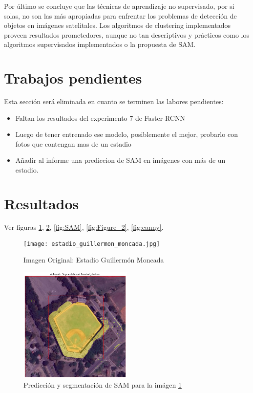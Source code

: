 \documentclass[article]{llncs}
\begin{document}
Por \'ultimo se concluye que las t\'ecnicas de aprendizaje no supervisado, por si solas, no son las m\'as apropiadas 
para enfrentar los problemas de detección de objetos en im\'agenes satelitales. Los algoritmos de clustering implementados 
proveen resultados prometedores, aunque no tan descriptivos y pr\'acticos como los algoritmos supervisados implementados o la 
propuesta de SAM.

\section{Trabajos pendientes}
Esta secci\'on ser\'a eliminada en cuanto se terminen las labores pendientes:

\begin{itemize}
    \item Faltan los resultados del experimento 7 de Faster-RCNN
    \item Luego de tener entrenado ese modelo, posiblemente el mejor, probarlo con fotos que contengan mas de un estadio
    \item Añadir al informe una prediccion de SAM en im\'agenes con m\'as de un estadio.
\end{itemize}

\section{Resultados}

Ver figuras \ref{fig:estadio_guillermon_moncada}, \ref{fig:Figure_1}, \ref{fig:SAM}, \ref{fig:Figure_2}, \ref{fig:canny}.

\begin{figure}[h]
  \centering
  \texttt{[image: estadio\_guillermon\_moncada.jpg]}
  \caption{Imagen Original: Estadio Guillerm\'on Moncada}
  \label{fig:estadio_guillermon_moncada}
\end{figure}

\begin{figure}[h]
  \centering
  \includegraphics[width=0.5\textwidth]{SAM.png}
  \caption{Predicci\'on y segmentación de SAM para la im\'agen \ref{fig:estadio_guillermon_moncada}}
  \label{fig:Figure_1}
\end{figure}
\end{document}
